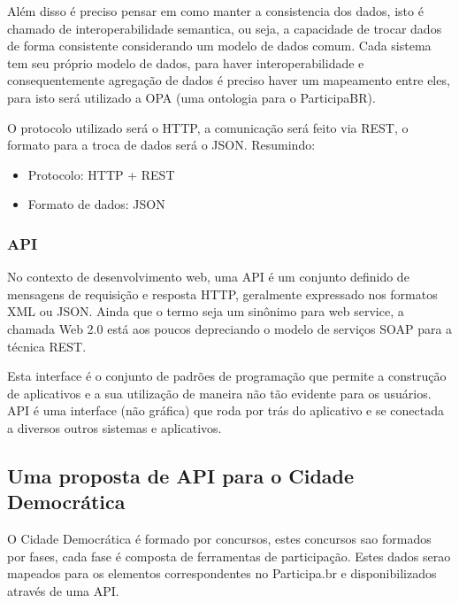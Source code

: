 \documentclass[12pt]{article}
\begin{document}
Além disso é preciso pensar em como manter a consistencia dos dados, isto é
chamado de interoperabilidade semantica, ou seja, a capacidade de trocar dados
de forma consistente considerando um modelo de dados comum. Cada sistema tem
seu próprio modelo de dados, para haver interoperabilidade e consequentemente
agregação de dados é preciso haver um mapeamento entre eles, para isto será
utilizado a OPA (uma ontologia para o ParticipaBR).

O protocolo utilizado será o HTTP, a comunicação será feito via REST,
o formato para a troca de dados será o JSON\cite{json}. Resumindo:

\begin{itemize}
  \item Protocolo: HTTP + REST
  \item Formato de dados: JSON
\end{itemize}




\subsubsection{API}

No contexto de desenvolvimento web, uma API é um conjunto definido de
mensagens de requisição e resposta HTTP, geralmente expressado nos formatos
XML ou JSON. Ainda que o termo seja um sinônimo para web service, a chamada Web
2.0 está aos poucos depreciando o modelo de serviços SOAP para a técnica REST.

Esta interface é o conjunto de padrões de programação que permite a construção
de aplicativos e a sua utilização de maneira não tão evidente para os
usuários. API é uma interface (não gráfica) que roda por trás do aplicativo e
se conectada a diversos outros sistemas e aplicativos.

\subsection{Uma proposta de API para o Cidade Democrática}

O Cidade Democrática é formado por concursos, estes concursos sao formados por
fases, cada fase é composta de ferramentas de participação. Estes dados serao
mapeados para os elementos correspondentes no Participa.br e disponibilizados
através de uma API.
\end{document}
